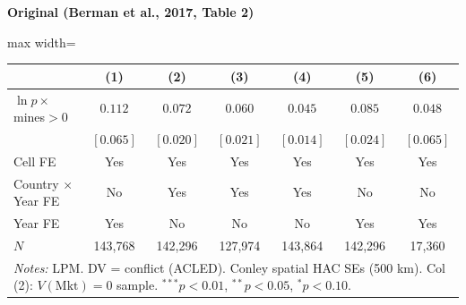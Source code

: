 \documentclass[11pt,a4paper]{article}
\begin{document}
\vspace{0.3cm}
\noindent{}

\vspace{0.5cm}
\begin{minipage}[t]{0.48\textwidth}
\centering
\textbf{\large Original (Berman et al., 2017, Table 2)}
\vspace{0.3cm}

\begin{adjustbox}{max width=\textwidth}
\begin{tabular}{lcccccc}
\toprule
 & (1) & (2) & (3) & (4) & (5) & (6) \\
\midrule
$\ln p \times$ mines$>$0 & $0.112$ & $0.072$ & $0.060$ & $0.045$ & $0.085$ & $0.048$ \\
 & $[0.065]$ & $[0.020]$ & $[0.021]$ & $[0.014]$ & $[0.024]$ & $[0.065]$ \\[0.3em]
\midrule
Cell FE & Yes & Yes & Yes & Yes & Yes & Yes \\
Country $\times$ Year FE & No & Yes & Yes & Yes & No & No \\
Year FE & Yes & No & No & No & Yes & Yes \\
$N$ & 143,768 & 142,296 & 127,974 & 143,864 & 142,296 & 17,360 \\
\bottomrule
\multicolumn{7}{p{0.95\textwidth}}{\footnotesize\textit{Notes:} LPM. DV = conflict (ACLED). Conley spatial HAC SEs (500 km). Col (2): $V(\text{Mkt})=0$ sample. $^{***}p<0.01$, $^{**}p<0.05$, $^{*}p<0.10$.}
\end{tabular}
\end{adjustbox}
\end{minipage}%
\hfill
\end{document}

